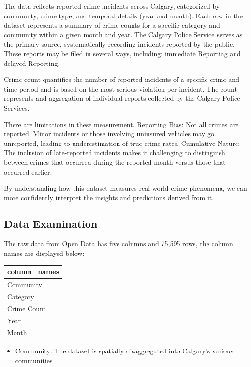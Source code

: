 \documentclass[
  letterpaper,
  DIV=11,
  numbers=noendperiod]{scrartcl}
\providecommand{\tightlist}{%
  \setlength{\itemsep}{0pt}\setlength{\parskip}{0pt}}\usepackage{longtable,booktabs,array}
\begin{document}
The data reflects reported crime incidents across Calgary, categorized
by community, crime type, and temporal details (year and month). Each
row in the dataset represents a summary of crime counts for a specific
category and community within a given month and year. The Calgary Police
Service serves as the primary source, systematically recording incidents
reported by the public. These reports may be filed in several ways,
including: immediate Reporting and delayed Reporting.

Crime count quantifies the number of reported incidents of a specific
crime and time period and is based on the most serious violation per
incident. The count represents and aggregation of individual reports
collected by the Calgary Police Services.

There are limitations in these measurement. Reporting Bias: Not all
crimes are reported. Minor incidents or those involving uninsured
vehicles may go unreported, leading to underestimation of true crime
rates. Cumulative Nature: The inclusion of late-reported incidents makes
it challenging to distinguish between crimes that occurred during the
reported month versus those that occurred earlier.

By understanding how this dataset measures real-world crime phenomena,
we can more confidently interpret the insights and predictions derived
from it.

\subsection{Data Examination}\label{sec-dataexam}

The raw data from Open Data has five columns and 75,595 rows, the column
names are displayed below:

\begin{longtable}[]{@{}l@{}}
\toprule\noalign{}
column\_names \\
\midrule\noalign{}
\endhead
\bottomrule\noalign{}
\endlastfoot
Community \\
Category \\
Crime Count \\
Year \\
Month \\
\end{longtable}

\begin{itemize}
\tightlist
\item
  Community: The dataset is spatially disaggregated into Calgary's
  various communities
\end{itemize}
\end{document}
